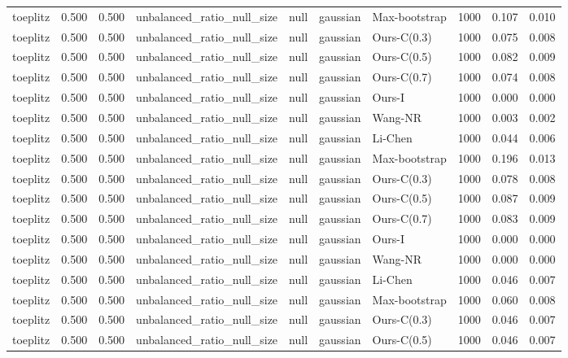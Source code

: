 \begin{tabular}{lrrllllrrr}
toeplitz & 0.500 & 0.500 & unbalanced\_ratio\_null\_size & null & gaussian & Max-bootstrap & 1000 & 0.107 & 0.010 \\
toeplitz & 0.500 & 0.500 & unbalanced\_ratio\_null\_size & null & gaussian & Ours-C(0.3) & 1000 & 0.075 & 0.008 \\
toeplitz & 0.500 & 0.500 & unbalanced\_ratio\_null\_size & null & gaussian & Ours-C(0.5) & 1000 & 0.082 & 0.009 \\
toeplitz & 0.500 & 0.500 & unbalanced\_ratio\_null\_size & null & gaussian & Ours-C(0.7) & 1000 & 0.074 & 0.008 \\
toeplitz & 0.500 & 0.500 & unbalanced\_ratio\_null\_size & null & gaussian & Ours-I & 1000 & 0.000 & 0.000 \\
toeplitz & 0.500 & 0.500 & unbalanced\_ratio\_null\_size & null & gaussian & Wang-NR & 1000 & 0.003 & 0.002 \\
toeplitz & 0.500 & 0.500 & unbalanced\_ratio\_null\_size & null & gaussian & Li-Chen & 1000 & 0.044 & 0.006 \\
toeplitz & 0.500 & 0.500 & unbalanced\_ratio\_null\_size & null & gaussian & Max-bootstrap & 1000 & 0.196 & 0.013 \\
toeplitz & 0.500 & 0.500 & unbalanced\_ratio\_null\_size & null & gaussian & Ours-C(0.3) & 1000 & 0.078 & 0.008 \\
toeplitz & 0.500 & 0.500 & unbalanced\_ratio\_null\_size & null & gaussian & Ours-C(0.5) & 1000 & 0.087 & 0.009 \\
toeplitz & 0.500 & 0.500 & unbalanced\_ratio\_null\_size & null & gaussian & Ours-C(0.7) & 1000 & 0.083 & 0.009 \\
toeplitz & 0.500 & 0.500 & unbalanced\_ratio\_null\_size & null & gaussian & Ours-I & 1000 & 0.000 & 0.000 \\
toeplitz & 0.500 & 0.500 & unbalanced\_ratio\_null\_size & null & gaussian & Wang-NR & 1000 & 0.000 & 0.000 \\
toeplitz & 0.500 & 0.500 & unbalanced\_ratio\_null\_size & null & gaussian & Li-Chen & 1000 & 0.046 & 0.007 \\
toeplitz & 0.500 & 0.500 & unbalanced\_ratio\_null\_size & null & gaussian & Max-bootstrap & 1000 & 0.060 & 0.008 \\
toeplitz & 0.500 & 0.500 & unbalanced\_ratio\_null\_size & null & gaussian & Ours-C(0.3) & 1000 & 0.046 & 0.007 \\
toeplitz & 0.500 & 0.500 & unbalanced\_ratio\_null\_size & null & gaussian & Ours-C(0.5) & 1000 & 0.046 & 0.007 \\

\end{tabular}
